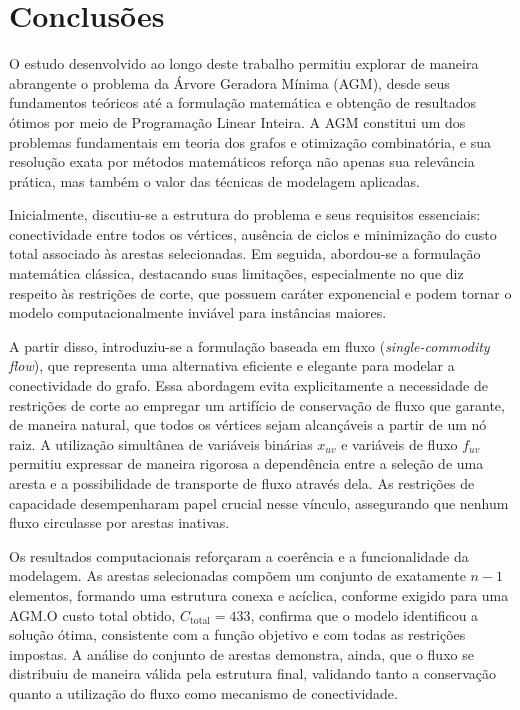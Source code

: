 \section{Conclusões}%
\label{sec:conclusoes}

O estudo desenvolvido ao longo deste trabalho permitiu explorar de maneira abrangente o problema da Árvore Geradora Mínima (AGM), desde seus fundamentos teóricos até a formulação matemática e obtenção de resultados ótimos por meio de Programação Linear Inteira. A AGM constitui um dos problemas fundamentais em teoria dos grafos e otimização combinatória, e sua resolução exata por métodos matemáticos reforça não apenas sua relevância prática, mas também o valor das técnicas de modelagem aplicadas.

Inicialmente, discutiu-se a estrutura do problema e seus requisitos essenciais: conectividade entre todos os vértices, ausência de ciclos e minimização do custo total associado às arestas selecionadas. Em seguida, abordou-se a formulação matemática clássica, destacando suas limitações, especialmente no que diz respeito às restrições de corte, que possuem caráter exponencial e podem tornar o modelo computacionalmente inviável para instâncias maiores.

A partir disso, introduziu-se a formulação baseada em fluxo (\textit{single-commodity flow}), que representa uma alternativa eficiente e elegante para modelar a conectividade do grafo. Essa abordagem evita explicitamente a necessidade de restrições de corte ao empregar um artifício de conservação de fluxo que garante, de maneira natural, que todos os vértices sejam alcançáveis a partir de um nó raiz. A utilização simultânea de variáveis binárias \(x_{uv}\) e variáveis de fluxo \(f_{uv}\) permitiu expressar de maneira rigorosa a dependência entre a seleção de uma aresta e a possibilidade de transporte de fluxo através dela. As restrições de capacidade desempenharam papel crucial nesse vínculo, assegurando que nenhum fluxo circulasse por arestas inativas.

Os resultados computacionais reforçaram a coerência e a funcionalidade da modelagem. As arestas selecionadas compõem um conjunto de exatamente \(n - 1\) elementos, formando uma estrutura conexa e acíclica, conforme exigido para uma AGM.\@ O custo total obtido, \(C_{\text{total}} = 433\), confirma que o modelo identificou a solução ótima, consistente com a função objetivo e com todas as restrições impostas. A análise do conjunto de arestas demonstra, ainda, que o fluxo se distribuiu de maneira válida pela estrutura final, validando tanto a conservação quanto a utilização do fluxo como mecanismo de conectividade.

